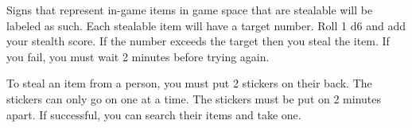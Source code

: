 \documentclass[green]{LRSguildcamp1}
\begin{document}
\name{\gStealing{}}

Signs that represent in-game items in game space that are stealable will be labeled as such. Each stealable item will have a target number. Roll 1 d6 and add your stealth score.  If the number exceeds the target then you steal the item. If you fail, you must wait 2 minutes before trying again.

To steal an item from a person, you must put 2 stickers on their back. The stickers can only go on one at a time. The stickers must be put on 2 minutes apart. If successful, you can search their items and take one.
\end{document}
